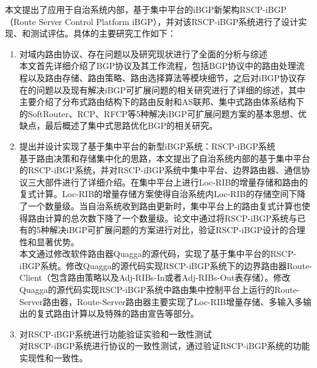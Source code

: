 本文提出了应用于自治系统内部，基于集中平台的iBGP新架构RSCP-iBGP（Route Server Control Platform iBGP），并对该RSCP-iBGP系统进行了设计实现、和测试评估。具体的主要研究工作如下：
\begin{enumerate}
\item 对域内路由协议、存在问题以及研究现状进行了全面的分析与综述\\
\hspace*{2em}本文首先详细介绍了BGP协议及其工作流程，包括BGP协议中的路由处理流程以及路由存储、路由策略、路由选择算法等模块细节，之后对iBGP协议存在的问题以及现有解决iBGP可扩展问题的相关研究进行了详细的综述，其中主要介绍了分布式路由结构下的路由反射和AS联邦、集中式路由体系结构下的SoftRouter、RCP、RFCP等5种解决iBGP可扩展问题方案的基本思想、优缺点，最后概述了集中式思路优化BGP的相关研究。

\item 提出并设计实现了基于集中平台的新型iBGP系统：RSCP-iBGP系统\\
\hspace*{2em}基于路由决策和存储集中化的思路，本文提出了自治系统内部的基于集中平台的RSCP-iBGP系统，并对RSCP-iBGP系统中集中平台、边界路由器、通信协议三大部件进行了详细介绍。在集中平台上进行Loc-RIB的增量存储和路由的复式计算。Loc-RIB的增量存储方案使得自治系统内Loc-RIB的存储空间下降了一个数量级。当自治系统收到路由更新时，集中平台上的路由复式计算也使得路由计算的总次数下降了一个数量级。论文中通过将RSCP-iBGP系统与已有的5种解决iBGP可扩展问题的方案进行对比，验证RSCP-iBGP设计的合理性和显著优势。\\
\hspace*{2em}本文通过修改软件路由器Quagga的源代码，实现了基于集中平台的RSCP-iBGP系统。修改Quagga的源代码实现RSCP-iBGP系统下的边界路由器Route-Client（包含路由策略以及Adj-RIBs-In或者Adj-RIBs-Out表存储）。修改Quagga的源代码实现RSCP-iBGP系统中路由集中控制平台上运行的Route-Server路由器，Route-Server路由器主要实现了Loc-RIB增量存储、多输入多输出的复式路由计算以及特殊的路由宣告等部分。

\item 对RSCP-iBGP系统进行功能验证实验和一致性测试 \\
\hspace*{2em}对RSCP-iBGP系统进行协议的一致性测试，通过验证RSCP-iBGP系统的功能实现性和一致性。
\end{enumerate}




